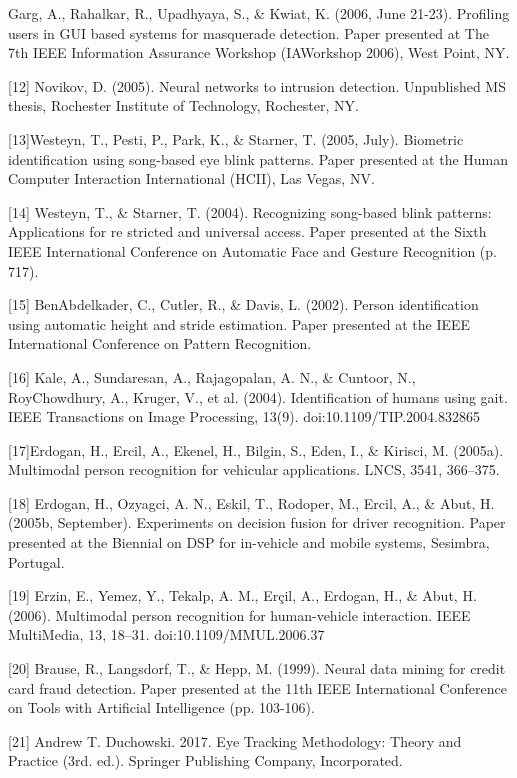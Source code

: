 \documentclass{article}
\begin{document}
\begin{raggedright}
[11] Garg, A., Rahalkar, R., Upadhyaya, S., \& Kwiat, K. (2006, June 21-23). Profiling users in GUI based systems for masquerade detection. Paper presented at The 7th IEEE Information Assurance Workshop (IAWorkshop 2006), West Point, NY.

[12] Novikov, D. (2005). Neural networks to intrusion detection. Unpublished MS thesis, Rochester Institute of Technology, Rochester, NY.

[13]Westeyn, T., Pesti, P., Park, K., \& Starner, T. (2005, July). Biometric identification using song-based eye blink patterns. Paper presented at the Human Computer Interaction International (HCII), Las Vegas, NV.

[14] Westeyn, T., \& Starner, T. (2004). Recognizing song-based blink patterns: Applications for re stricted and universal access. Paper presented at the Sixth IEEE International Conference on Automatic Face and Gesture Recognition (p. 717).

[15]  BenAbdelkader, C., Cutler, R., \& Davis, L. (2002). Person identification using automatic height and stride estimation. Paper presented at the IEEE International Conference on Pattern Recognition.

[16] Kale, A., Sundaresan, A., Rajagopalan, A. N., \& Cuntoor, N., RoyChowdhury, A., Kruger, V., et al. (2004). Identification of humans using gait. IEEE Transactions on Image Processing, 13(9). doi:10.1109/TIP.2004.832865

[17]Erdogan, H., Ercil, A., Ekenel, H., Bilgin, S., Eden, I., \& Kirisci, M. (2005a). Multimodal person recognition for vehicular applications. LNCS, 3541, 366–375.

[18] Erdogan, H., Ozyagci, A. N., Eskil, T., Rodoper, M., Ercil, A., \& Abut, H. (2005b, September). Experiments on decision fusion for driver recognition. Paper presented at the Biennial on DSP for in-vehicle and mobile systems, Sesimbra, Portugal.

[19] Erzin, E., Yemez, Y., Tekalp, A. M., Erçil, A., Erdogan, H., \& Abut, H. (2006). Multimodal person recognition for human-vehicle interaction. IEEE MultiMedia, 13, 18–31. doi:10.1109/MMUL.2006.37

[20]  Brause, R., Langsdorf, T., \& Hepp, M. (1999). Neural data mining for credit card fraud detection. Paper presented at the 11th IEEE International Conference on Tools with Artificial Intelligence (pp. 103-106).

[21] Andrew T. Duchowski. 2017. Eye Tracking Methodology: Theory and Practice (3rd. ed.). Springer Publishing Company, Incorporated.


\end{raggedright}
\end{document}
